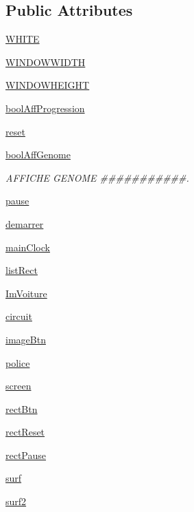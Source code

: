\subsection*{Public Attributes}
\begin{DoxyCompactItemize}
\item 
\hyperlink{classaffichage_1_1_affichage_a83fc01f0d1bed94859d7f945e4c119ce}{W\+H\+I\+TE}
\item 
\hyperlink{classaffichage_1_1_affichage_aab192d8bb91c1687fb02898a80beecf1}{W\+I\+N\+D\+O\+W\+W\+I\+D\+TH}
\item 
\hyperlink{classaffichage_1_1_affichage_ad9105ba379e4d18342b3aee4ea199ab4}{W\+I\+N\+D\+O\+W\+H\+E\+I\+G\+HT}
\item 
\hyperlink{classaffichage_1_1_affichage_af65584cd9fab64ae77b2f27c59e4f346}{bool\+Aff\+Progression}
\item 
\hyperlink{classaffichage_1_1_affichage_a2e403c62c0b5ec8893d3a66f17a16384}{reset}
\item 
\hyperlink{classaffichage_1_1_affichage_a5ae8cd3838187cd4b0ebab27b1da1e16}{bool\+Aff\+Genome}
\begin{DoxyCompactList}\small\item\em A\+F\+F\+I\+C\+HE G\+E\+N\+O\+ME \#\#\#\#\#\#\#\#\#\#\#. \end{DoxyCompactList}\item 
\hyperlink{classaffichage_1_1_affichage_a9092af498d35b0d67bd3766808d17ec3}{pause}
\item 
\hyperlink{classaffichage_1_1_affichage_a156e18adf2b1849d7b944ad0dc765ea5}{demarrer}
\item 
\hyperlink{classaffichage_1_1_affichage_af2f5584c1a3de62a20737fe7fe5dd1c0}{main\+Clock}
\item 
\hyperlink{classaffichage_1_1_affichage_a3d63bdab0c70e2a7a746896b33b36e35}{list\+Rect}
\item 
\hyperlink{classaffichage_1_1_affichage_a23d2c252245a15bedabd207f7bb2378e}{Im\+Voiture}
\item 
\hyperlink{classaffichage_1_1_affichage_ab81a15d6f5eb57911b1a8a2b1b2f43cb}{circuit}
\item 
\hyperlink{classaffichage_1_1_affichage_a2580d08d45179ad65a28ae58c5f9d9b6}{image\+Btn}
\item 
\hyperlink{classaffichage_1_1_affichage_a5a0678437f947889167137bd1e87108e}{police}
\item 
\hyperlink{classaffichage_1_1_affichage_a7b058db87aafd3b45c8f034df0d003cb}{screen}
\item 
\hyperlink{classaffichage_1_1_affichage_a405ae54162563c87555fb65fb94197c4}{rect\+Btn}
\item 
\hyperlink{classaffichage_1_1_affichage_a5267ea26272e476c5455abf137d1d363}{rect\+Reset}
\item 
\hyperlink{classaffichage_1_1_affichage_adfc1a639d0d90c153f4bd420209bd6b3}{rect\+Pause}
\item 
\hyperlink{classaffichage_1_1_affichage_a78a7280c311729f4dbb9a3934d1fb712}{surf}
\item 
\hyperlink{classaffichage_1_1_affichage_ad48d66124db12193345d9dee2040fe33}{surf2}
\end{DoxyCompactItemize}


